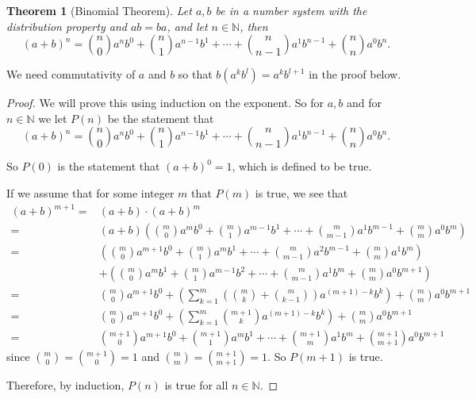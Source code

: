 \documentclass[
]{book}
\newtheorem{theorem}{Theorem}[chapter]
\theoremstyle{definition}
\theoremstyle{definition}
\theoremstyle{definition}
\theoremstyle{definition}
\theoremstyle{remark}
\begin{document}
\begin{theorem}[Binomial Theorem]
\protect\hypertarget{thm:binomial}{}\label{thm:binomial}Let \(a,b\) be in a number system with the distribution property and \(ab=ba\), and let \(n\in \mathbb{N}\), then
\[(a+b)^n = \binom{n}{0} a^n b^0 + \binom{n}{1} a^{n-1}b^1 + \cdots + \binom{n}{n-1} a^{1}b^{n-1} + \binom{n}{n} a^0 b^n.\]
\end{theorem}

We need commutativity of \(a\) and \(b\) so that \(b (a^k b^l) = a^k b^{l+1}\) in the proof below.

\begin{proof}
We will prove this using induction on the exponent. So for \(a,b\) and for \(n\in \mathbb{N}\) we let \(P(n)\) be the statement that \[(a+b)^n = \binom{n}{0} a^n b^0 + \binom{n}{1} a^{n-1}b^1 + \cdots + \binom{n}{n-1} a^{1}b^{n-1} + \binom{n}{n} a^0 b^n.\]

So \(P(0)\) is the statement that \((a+b)^0 = 1\), which is defined to be true.

If we assume that for some integer \(m\) that \(P(m)\) is true, we see that
\begin{align*}
(a+b)^{m+1} = & (a+b) \cdot (a+b)^m\\
= & (a+b) \left( \binom{m}{0} a^m b^0 + \binom{m}{1} a^{m-1}b^1 + \cdots + \binom{m}{m-1} a^{1}b^{m-1} + \binom{m}{m} a^0 b^m\right) \\
= & \left( \binom{m}{0} a^{m+1} b^0 + \binom{m}{1} a^{m}b^1 + \cdots + \binom{m}{m-1} a^{2}b^{m-1} + \binom{m}{m} a^1 b^m\right) \\
&  + \left( \binom{m}{0} a^m b^1 + \binom{m}{1} a^{m-1}b^2 + \cdots + \binom{m}{m-1} a^{1}b^{m} + \binom{m}{m} a^0 b^{m+1}\right) \\
= & \binom{m}{0} a^{m+1}b^0 + \left( \sum_{k=1}^m \left(\binom{m}{k} + \binom{m}{k-1} \right) a^{(m+1)-k}b^k \right) + \binom{m}{m} a^0 b^{m+1} \\
= & \binom{m}{0} a^{m+1}b^0 + \left( \sum_{k=1}^m \binom{m+1}{k} a^{(m+1)-k}b^k \right) + \binom{m}{m} a^0 b^{m+1} \\
= & \binom{m+1}{0} a^{m+1} b^0 + \binom{m+1}{1} a^{m}b^1 + \cdots + \binom{m+1}{m} a^{1}b^{m} + \binom{m+1}{m+1} a^0 b^{m+1}
\end{align*}
since \(\binom{m}{0}=\binom{m+1}{0}=1\) and \(\binom{m}{m}=\binom{m+1}{m+1}=1\). So \(P(m+1)\) is true.

Therefore, by induction, \(P(n)\) is true for all \(n\in \mathbb{N}\).
\end{proof}
\end{document}
